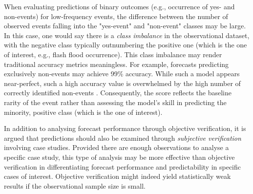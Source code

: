 When  evaluating predictions of binary outcomes (e.g., occurrence of yes- and non-events) for low-frequency events, the difference between the number of observed events falling into the "yes-event" and "non-event" classes may be large. In this case, one would say there is a \textit{class imbalance} in the observational dataset, with the negative class typically outnumbering the positive one (which is the one of interest, e.g., flash flood occurrence). This class imbalance may render traditional accuracy metrics meaningless. For example, forecasts predicting exclusively non-events may achieve 99\% accuracy. While such a model appears near-perfect, such a high accuracy value is overwhelmed by the high number of correctly identified non-events \citep{Wilks_2020}. Consequently, the score reflects the baseline rarity of the event rather than assessing the model's skill in predicting the minority, positive class (which is the one of interest).

In  addition to analysing forecast performance through objective verification, it is argued that predictions should also be examined through \textit{subjective verification} involving case studies. Provided there are enough observations to analyse a specific case study, this type of analysis may be more effective than objective verification in differentiating forecast performance and predictability in specific cases of interest. Objective verification might indeed yield statistically weak results if the observational sample size is small. 

